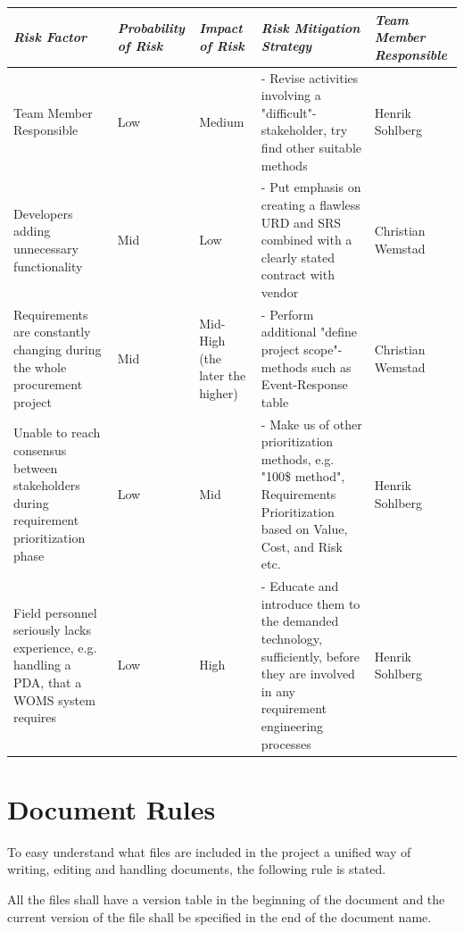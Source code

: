 \documentclass[a4paper]{article}
\begin{document}
\begin{table}[H]
	\centering
	\begin{tabular}{|p{2.5cm}| p{2.5cm} |p{2.5cm}| p{2.5cm} | p{2.5cm} |}
	\hline
		\textit{Risk Factor} & \textit{Probability of Risk} & \textit{Impact of Risk} & \textit{Risk Mitigation Strategy} & \textit{Team Member Responsible} \\
		
	\hline 
		Team Member Responsible & Low & Medium & - Revise activities involving a "difficult"-stakeholder, try find other suitable methods & Henrik Sohlberg \\ \hline 
		Developers adding unnecessary functionality & Mid & Low & - Put emphasis on creating a flawless URD and SRS combined with a clearly stated contract with vendor & Christian Wemstad \\ \hline 
		Requirements are constantly changing during the whole procurement project & Mid & Mid-High (the later the higher) & - Perform additional "define project scope"- methods
such as Event-Response table & Christian Wemstad \\ \hline 
		Unable to reach consensus between stakeholders during requirement prioritization phase & Low & Mid & - Make us of other  prioritization methods, e.g. "100\$ method", Requirements Prioritization based on Value, Cost, and Risk etc. & Henrik Sohlberg \\ \hline 
		Field personnel seriously lacks experience, e.g. handling a PDA, that a WOMS system requires & Low & High & 
- Educate and introduce them to the demanded technology, sufficiently, before they are involved in any requirement engineering processes & Henrik Sohlberg \\ \hline 



		
	\end{tabular}
\end{table}

\section{Document Rules} 
\label{sec:document_rules}

To easy understand what files are included in the project a unified way of writing, editing and handling documents, the following rule is stated. 

All the files shall have a version table in the beginning of the document and the current version of the file shall be specified in the end of the document name.
\end{document}
